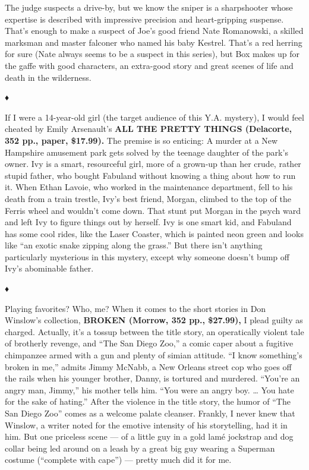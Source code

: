 The judge suspects a drive-by, but we know the sniper is a sharpshooter
whose expertise is described with impressive precision and
heart-gripping suspense. That's enough to make a suspect of Joe's good
friend Nate Romanowski, a skilled marksman and master falconer who named
his baby Kestrel. That's a red herring for sure (Nate always seems to be
a suspect in this series), but Box makes up for the gaffe with good
characters, an extra-good story and great scenes of life and death in
the wilderness.

♦

If I were a 14-year-old girl (the target audience of this Y.A. mystery),
I would feel cheated by Emily Arsenault's \textbf{ALL THE PRETTY THINGS
(Delacorte, 352 pp., paper, \$17.99).} The premise is so enticing: A
murder at a New Hampshire amusement park gets solved by the teenage
daughter of the park's owner. Ivy is a smart, resourceful girl, more of
a grown-up than her crude, rather stupid father, who bought Fabuland
without knowing a thing about how to run it. When Ethan Lavoie, who
worked in the maintenance department, fell to his death from a train
trestle, Ivy's best friend, Morgan, climbed to the top of the Ferris
wheel and wouldn't come down. That stunt put Morgan in the psych ward
and left Ivy to figure things out by herself. Ivy is one smart kid, and
Fabuland has some cool rides, like the Laser Coaster, which is painted
neon green and looks like ``an exotic snake zipping along the grass.''
But there isn't anything particularly mysterious in this mystery, except
why someone doesn't bump off Ivy's abominable father.

♦

Playing favorites? Who, me? When it comes to the short stories in Don
Winslow's collection, \textbf{BROKEN (Morrow, 352 pp., \$27.99),} I
plead guilty as charged. Actually, it's a tossup between the title
story, an operatically violent tale of brotherly revenge, and ``The San
Diego Zoo,'' a comic caper about a fugitive chimpanzee armed with a gun
and plenty of simian attitude. ``I know something's broken in me,''
admits Jimmy McNabb, a New Orleans street cop who goes off the rails
when his younger brother, Danny, is tortured and murdered. ``You're an
angry man, Jimmy,'' his mother tells him. ``You were an angry boy.
\ldots{} You hate for the sake of hating.'' After the violence in the
title story, the humor of ``The San Diego Zoo'' comes as a welcome
palate cleanser. Frankly, I never knew that Winslow, a writer noted for
the emotive intensity of his storytelling, had it in him. But one
priceless scene --- of a little guy in a gold lamé jockstrap and dog
collar being led around on a leash by a great big guy wearing a Superman
costume (``complete with cape'') --- pretty much did it for me.

